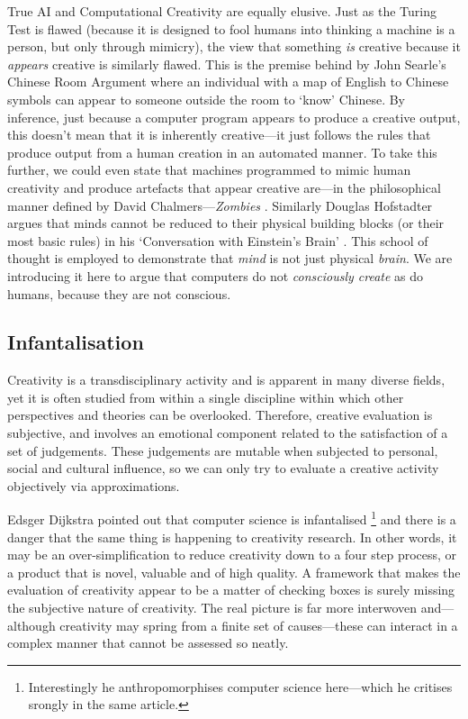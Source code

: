 True \ac{AI} and Computational Creativity are equally elusive. Just as the Turing Test \autocite{Turing1950} is flawed (because it is designed to fool humans into thinking a machine is a person, but only through mimicry), the view that something \emph{is} creative because it \emph{appears} creative is similarly flawed. This is the premise behind by John Searle's Chinese Room Argument \autocite{Searle1980} where an individual with a map of English to Chinese symbols can appear to someone outside the room to `know' Chinese. By inference, just because a computer program appears to produce a creative output, this doesn't mean that it is inherently creative---it just follows the rules that produce output from a human creation in an automated manner. To take this further, we could even state that machines programmed to mimic human creativity and produce artefacts that appear creative are---in the philosophical manner defined by David Chalmers---\emph{Zombies} \autocite{Chalmers1996}. Similarly Douglas Hofstadter argues that minds cannot be reduced to their physical building blocks (or their most basic rules) in his `Conversation with Einstein\rq s Brain' \autocite{Hofstadter1981}. This school of thought is employed to demonstrate that \emph{mind} is not just physical \emph{brain}. \colorbox{red!30}{We} are introducing it here to argue that computers do not \emph{consciously create} as do humans, because they are not conscious.

\subsection{Infantalisation}
\label{s:babying}

Creativity is a transdisciplinary activity and is apparent in many diverse fields, yet it is often studied from within a single discipline within which other perspectives and theories can be overlooked. Therefore, creative evaluation is subjective, and involves an emotional component related to the satisfaction of a set of judgements. These judgements are mutable when subjected to personal, social and cultural influence, so we can only try to evaluate a creative activity objectively via approximations.

Edsger Dijkstra pointed out that computer science is infantalised \autocite{Dijkstra1988}\footnote{Interestingly he anthropomorphises computer science here---which he critises srongly in the same article.} and there is a danger that the same thing is happening to creativity research. In other words, it may be an over-simplification to reduce creativity down to a four step process, or a product that is novel, valuable and of high quality. A framework that makes the evaluation of creativity appear to be a matter of checking boxes is surely missing the subjective nature of creativity. The real picture is far more interwoven and---although creativity may spring from a finite set of causes---these can interact in a complex manner that cannot be assessed so neatly.

